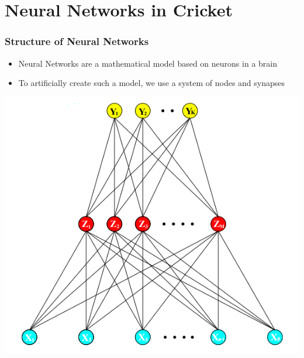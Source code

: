 \documentclass{beamer}
\begin{document}
\section{Neural Networks in Cricket}
\begin{frame}
\frametitle{Structure of Neural Networks}
    \begin{itemize}
        \item Neural Networks are a mathematical model based on neurons in a brain
        \pause
        \item To artificially create such a model, we use a system of nodes and synapses
    \end{itemize}
    \begin{example}
        \centering
        \includegraphics[scale=0.3]{../Thesis/figures/nn.png}
    \end{example}
\end{frame}
\end{document}
